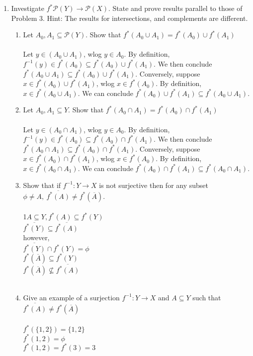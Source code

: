 \documentclass[11pt]{article}
\begin{document}
\begin{enumerate}
\item Investigate $f^*\mathcal{P}(Y) \to \mathcal{P}(X)$. State and prove results
parallel to those of Problem 3. Hint: The results for intersections, and complements are different.\\

\begin{enumerate}
\item Let $A_0 , A_1 \subseteq \mathcal{P}(Y)$. Show that $f^*(A_0 \cup A_1 ) = f^*(A_0) \cup f^*(A_1)$
\\ \\
Let $y \in (A_0 \cup A_1)$, wlog $y \in A_0$.  By definition, $f^{-1}(y) \in f^*(A_0) \subseteq f^*(A_0) \cup f^*(A_1).$  We then conclude $f^*(A_0 \cup A_1) \subseteq f^*(A_0) \cup f^*(A_1)$.  Conversely, suppose $x \in f^*(A_0) \cup f^*(A_1)$, wlog $x \in f^*(A_0)$.  By definition, $x \in f^*(A_0 \cup A_1)$.  We can conclude $f^*(A_0) \cup f^*(A_1) \subseteq f^*(A_0 \cup A_1)$.
\\

\item Let $A_0 , A_1 \subseteq Y$. Show that $f^*(A_0 \cap A_1 ) = f^*(A_0) \cap f^*(A_1)$
\\ \\
Let $y \in (A_0 \cap A_1)$, wlog $y \in A_0$.  By definition, $f^{-1}(y) \in f^*(A_0) \subseteq f^*(A_0) \cap f^*(A_1).$  We then conclude $f^*(A_0 \cap A_1) \subseteq f^*(A_0) \cap f^*(A_1)$.  Conversely, suppose $x \in f^*(A_0) \cap f^*(A_1)$, wlog $x \in f^*(A_0)$.  By definition, $x \in f^*(A_0 \cap A_1)$.  We can conclude $f^*(A_0) \cap f^*(A_1) \subseteq f^*(A_0 \cap A_1)$.
\\


\item Show that if $f^{-1}:Y \to X$ is not surjective then for any subset $\phi \neq A,\   \overline{f^*(A)} \neq f^*(\overline{A})$.\\
\\
1$A \subseteq Y, f^*(A) \subseteq f^*(Y)$\\
$\overline{f^*(Y)} \subseteq \overline{f^*(A)}$\\
however,\\
$\overline{f^*(Y)} \cap f^*(Y) = \phi$\\
$f^*(\overline{A}) \subseteq f^*(Y)$\\
$f^*(\overline{A}) \nsubseteq \overline{f^*(A)}$\\
\\
\item Give an example of a surjection $f^{-1}: Y \to X$ and $A \subseteq Y$ such that $\overline{f^*(A)} \neq f^*(\overline{A})$\\
\\
$f^*(\{1,2\}) = \{1,2\}$\\
$f^*(1,2) = \phi$\\
$f^*(1,2) = f^*(3) = 3$
\end{enumerate} %
\newpage


\end{enumerate}
\end{document}
